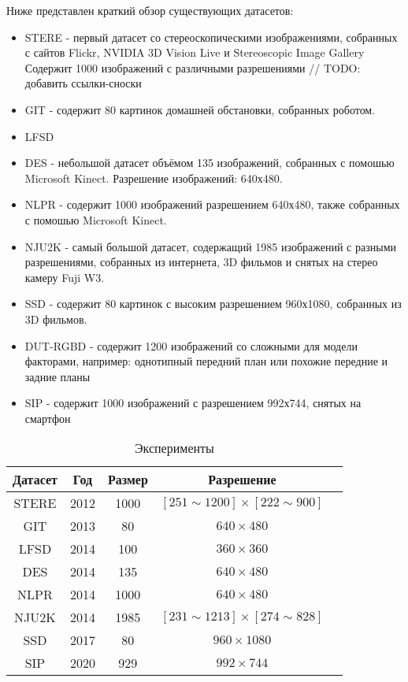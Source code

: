 Ниже представлен краткий обзор существующих датасетов:
\begin{itemize}
    \item STERE \cite{STERE} - первый датасет со стереоскопическими изображениями, собранных с сайтов Flickr, NVIDIA 3D Vision Live и Stereoscopic Image Gallery
    Содержит 1000 изображений с различными разрешениями // TODO: добавить ссылки-сноски
    \item GIT \cite{GIT} - содержит 80 картинок домашней обстановки, собранных роботом.
    \item LFSD \cite{LFSD}
    \item DES \cite{DES} - небольшой датасет объёмом 135 изображений, собранных с помошью Microsoft Kinect. Разрешение изображений: 640х480.
    \item NLPR \cite{NLPR} - содержит 1000 изображений разрешением 640х480, также собранных с помошью Microsoft Kinect.
    \item NJU2K \cite{NJU2K} - самый большой датасет, содержащий 1985 изображений с разными разрешениями, собранных из интернета, 3D фильмов и снятых на стерео камеру Fuji W3.
    \item SSD \cite{SSD} - содержит 80 картинок с высоким разрешением 960х1080, собранных из 3D фильмов.
    \item DUT-RGBD \cite{DUT} - содержит 1200 изображений со сложными для модели факторами, например: однотипный передний план или похожие передние и задние планы
    \item SIP \cite{Rethinking-RGBD} - содержит 1000 изображений с разрешением 992х744, снятых на смартфон
\end{itemize}


\begin{center}
    \begin{table}
        \begin{tabular}{|c|c|c|c|c|} 
            \hline
            Датасет & Год & Размер & Разрешение\\
            \hline
            \hline
            STERE\cite{STERE} & 2012 & 1000 & $[251 \sim 1200] \times [222 \sim 900]$ \\
            \hline
            GIT\cite{GIT} & 2013 & 80 & $640 \times 480$ \\
            \hline
            LFSD\cite{LFSD} & 2014 & 100 & $360 \times 360$ \\
            \hline
            DES\cite{DES} & 2014 & 135 & $640 \times 480$  \\
            \hline
            NLPR\cite{NLPR} & 2014 & 1000 &  $640 \times 480$ \\
            \hline
            NJU2K\cite{NJU2K} & 2014 & 1985 & $[231 \sim 1213] \times [274 \sim 828]$\\
            \hline
            SSD\cite{SSD} & 2017 & 80 & $960 \times 1080$\\
            \hline
            SIP\cite{Rethinking-RGBD} & 2020 & 929 &  $992 \times 744$\\
            \hline
        \end{tabular}
    \caption{Эксперименты}
    \label{tab:datasets}
    \end{table}
\end{center}

